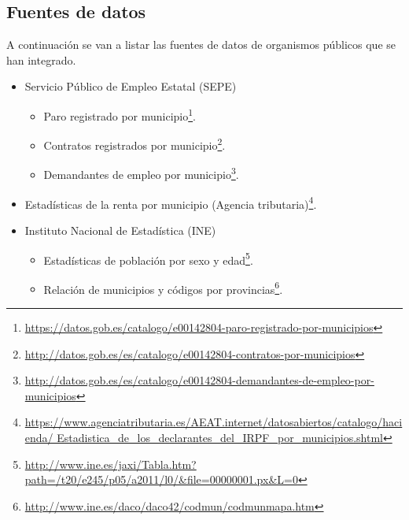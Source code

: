 \subsection{Fuentes de datos}

A continuación se van a listar las fuentes de datos de organismos públicos que se han integrado.

\begin{itemize}
	\tightlist
	\item
	Servicio Público de Empleo Estatal (SEPE)
	\begin{itemize}
		\tightlist
		\item
		Paro registrado por municipio\footnote{\href{https://datos.gob.es/catalogo/e00142804-paro-registrado-por-municipios}{https://datos.gob.es/catalogo/e00142804-paro-registrado-por-municipios}}.
		\item
		Contratos registrados por municipio\footnote{\href{http://datos.gob.es/es/catalogo/e00142804-contratos-por-municipios}{http://datos.gob.es/es/catalogo/e00142804-contratos-por-municipios}}.
		\item
		Demandantes de empleo por municipio\footnote{\href{http://datos.gob.es/es/catalogo/e00142804-demandantes-de-empleo-por-municipios}{http://datos.gob.es/es/catalogo/e00142804-demandantes-de-empleo-por-municipios}}.
	\end{itemize}
	\item 
	Estadísticas de la renta por municipio (Agencia tributaria)\footnote{\href{https://www.agenciatributaria.es/AEAT.internet/datosabiertos/catalogo/hacienda/Estadistica\_de\_los\_declarantes\_del\_IRPF\_por\_municipios.shtml}{https://www.agenciatributaria.es/AEAT.internet/datosabiertos/catalogo/hacienda/ Estadistica\_de\_los\_declarantes\_del\_IRPF\_por\_municipios.shtml}}.
	\item
	Instituto Nacional de Estadística (INE)
	\begin{itemize}
		\item
		Estadísticas de población por sexo y edad\footnote{\href{http://www.ine.es/jaxi/Tabla.htm?path=/t20/e245/p05/a2011/l0/\&file=00000001.px\&L=0}{http://www.ine.es/jaxi/Tabla.htm?path=/t20/e245/p05/a2011/l0/\&file=00000001.px\&L=0}}.
		\item
		Relación de municipios y códigos por provincias\footnote{\href{http://www.ine.es/daco/daco42/codmun/codmunmapa.htm}{http://www.ine.es/daco/daco42/codmun/codmunmapa.htm}}.
	\end{itemize}
\end{itemize}



